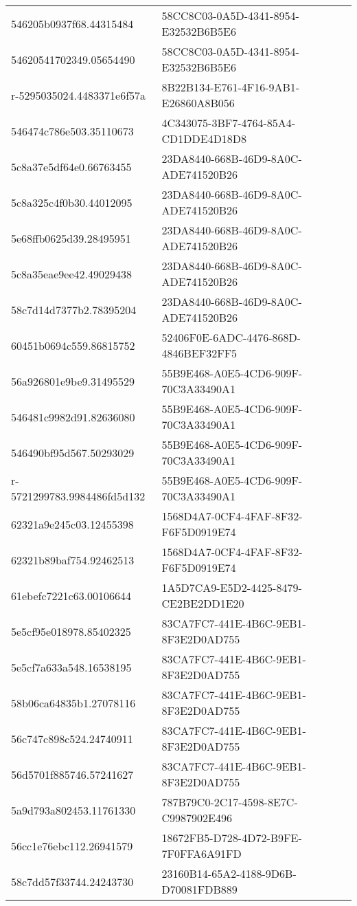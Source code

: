 \begin{tabular}{ll}
546205b0937f68.44315484 & 58CC8C03-0A5D-4341-8954-E32532B6B5E6 \\
54620541702349.05654490 & 58CC8C03-0A5D-4341-8954-E32532B6B5E6 \\
r-5295035024.4483371e6f57a & 8B22B134-E761-4F16-9AB1-E26860A8B056 \\
546474c786e503.35110673 & 4C343075-3BF7-4764-85A4-CD1DDE4D18D8 \\
5c8a37e5df64e0.66763455 & 23DA8440-668B-46D9-8A0C-ADE741520B26 \\
5c8a325c4f0b30.44012095 & 23DA8440-668B-46D9-8A0C-ADE741520B26 \\
5e68ffb0625d39.28495951 & 23DA8440-668B-46D9-8A0C-ADE741520B26 \\
5c8a35eae9ee42.49029438 & 23DA8440-668B-46D9-8A0C-ADE741520B26 \\
58c7d14d7377b2.78395204 & 23DA8440-668B-46D9-8A0C-ADE741520B26 \\
60451b0694c559.86815752 & 52406F0E-6ADC-4476-868D-4846BEF32FF5 \\
56a926801e9be9.31495529 & 55B9E468-A0E5-4CD6-909F-70C3A33490A1 \\
546481c9982d91.82636080 & 55B9E468-A0E5-4CD6-909F-70C3A33490A1 \\
546490bf95d567.50293029 & 55B9E468-A0E5-4CD6-909F-70C3A33490A1 \\
r-5721299783.9984486fd5d132 & 55B9E468-A0E5-4CD6-909F-70C3A33490A1 \\
62321a9e245c03.12455398 & 1568D4A7-0CF4-4FAF-8F32-F6F5D0919E74 \\
62321b89baf754.92462513 & 1568D4A7-0CF4-4FAF-8F32-F6F5D0919E74 \\
61ebefc7221c63.00106644 & 1A5D7CA9-E5D2-4425-8479-CE2BE2DD1E20 \\
5e5cf95e018978.85402325 & 83CA7FC7-441E-4B6C-9EB1-8F3E2D0AD755 \\
5e5cf7a633a548.16538195 & 83CA7FC7-441E-4B6C-9EB1-8F3E2D0AD755 \\
58b06ca64835b1.27078116 & 83CA7FC7-441E-4B6C-9EB1-8F3E2D0AD755 \\
56c747c898c524.24740911 & 83CA7FC7-441E-4B6C-9EB1-8F3E2D0AD755 \\
56d5701f885746.57241627 & 83CA7FC7-441E-4B6C-9EB1-8F3E2D0AD755 \\
5a9d793a802453.11761330 & 787B79C0-2C17-4598-8E7C-C9987902E496 \\
56cc1e76ebc112.26941579 & 18672FB5-D728-4D72-B9FE-7F0FFA6A91FD \\
58c7dd57f33744.24243730 & 23160B14-65A2-4188-9D6B-D70081FDB889 \\

\end{tabular}
